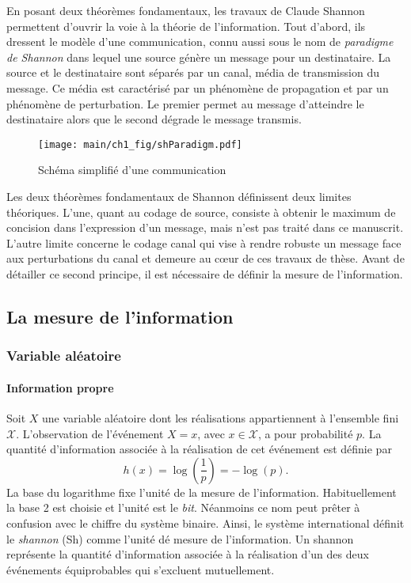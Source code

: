 En posant deux théorèmes fondamentaux, les travaux de Claude Shannon permettent d'ouvrir la voie à la théorie de 
l'information. Tout d'abord, ils dressent le modèle d'une communication, connu aussi sous le nom de 
\emph{paradigme de Shannon} dans lequel une source génère un message pour un destinataire. La source et le 
destinataire sont séparés par un canal, média de transmission du message. 
Ce média est caractérisé par un phénomène de propagation et par un phénomène de perturbation. Le premier permet au message 
d'atteindre le destinataire alors que le second dégrade le message transmis.

\begin{figure}[!h]
	\centering
	\texttt{[image: main/ch1\_fig/shParadigm.pdf]}
	\caption{\label{fig:paradigme} Schéma simplifié d'une communication}
\end{figure}


Les deux théorèmes fondamentaux de Shannon définissent deux limites théoriques. L'une, quant au codage de source, 
consiste à obtenir le maximum de concision dans l'expression d'un message, mais n'est pas traité dans ce manuscrit. 
L'autre limite concerne le codage canal qui vise à rendre robuste un message face aux perturbations du canal et demeure au 
cœur de ces travaux de thèse. Avant de détailler ce second principe, il est nécessaire de définir la mesure de l'information.
\subsection{La mesure de l'information}
\subsubsection{Variable aléatoire}
\paragraph*{Information propre}
Soit $X$ une variable aléatoire dont les réalisations appartiennent à l'ensemble fini $\mathcal{X}$. L'observation de 
l'événement $X=x$, avec $x\in \mathcal{X}$, a pour probabilité $p$. La quantité d'information associée à la réalisation
de cet événement est définie par \[h(x)=\log(\frac{1}{p})=-\log(p).\]
La base du logarithme fixe l'unité de la mesure de l'information. Habituellement la base 2 est
choisie et l'unité est le \emph{bit}. Néanmoins ce nom peut prêter à confusion avec le chiffre du système binaire. 
Ainsi, le système international \cite{ISO} définit le \emph{shannon} (Sh) comme l'unité dé mesure de l'information. Un shannon 
représente la quantité d’information associée à la réalisation d'un des deux événements équiprobables qui s’excluent 
mutuellement. 

